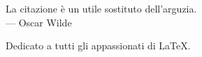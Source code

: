 
\cleardoublepage
{}
\thispagestyle{empty}

\vspace*{3cm}

\begin{center}
La citazione è un utile sostituto dell'arguzia. \\ \medskip
--- Oscar Wilde    
\end{center}

\medskip

\begin{center}
Dedicato a tutti gli appassionati di \LaTeX.
\end{center}
